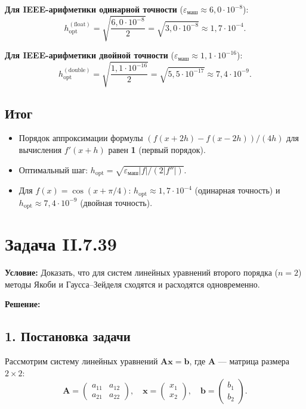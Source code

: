 \documentclass{article}
\begin{document}
\textbf{Для IEEE-арифметики одинарной точности} ($\varepsilon_{\text{маш}} \approx 6{,}0 \cdot 10^{-8}$):
\begin{equation}
h_{\text{opt}}^{(\text{float})} = \sqrt{\frac{6{,}0 \cdot 10^{-8}}{2}} = \sqrt{3{,}0 \cdot 10^{-8}} \approx 1{,}7 \cdot 10^{-4}.
\end{equation}

\textbf{Для IEEE-арифметики двойной точности} ($\varepsilon_{\text{маш}} \approx 1{,}1 \cdot 10^{-16}$):
\begin{equation}
h_{\text{opt}}^{(\text{double})} = \sqrt{\frac{1{,}1 \cdot 10^{-16}}{2}} = \sqrt{5{,}5 \cdot 10^{-17}} \approx 7{,}4 \cdot 10^{-9}.
\end{equation}

\subsection*{Итог}

\begin{itemize}
\item Порядок аппроксимации формулы $(f(x+2h) - f(x-2h))/(4h)$ для вычисления $f'(x+h)$ равен \textbf{1} (первый порядок).
\item Оптимальный шаг: $h_{\text{opt}} = \sqrt{\varepsilon_{\text{маш}} |f| / (2|f''|)}$.
\item Для $f(x) = \cos(x + \pi/4)$: $h_{\text{opt}} \approx 1{,}7 \cdot 10^{-4}$ (одинарная точность) и $h_{\text{opt}} \approx 7{,}4 \cdot 10^{-9}$ (двойная точность).
\end{itemize}






\section*{Задача II.7.39}

\textbf{Условие:} Доказать, что для систем линейных уравнений второго порядка ($n = 2$) методы Якоби и Гаусса--Зейделя сходятся и расходятся одновременно.

\vspace{0.5cm}
\textbf{Решение:}

\subsection*{1. Постановка задачи}

Рассмотрим систему линейных уравнений $\mathbf{A}\mathbf{x} = \mathbf{b}$, где $\mathbf{A}$ --- матрица размера $2 \times 2$:
\begin{equation}
\mathbf{A} =
\begin{pmatrix}
a_{11} & a_{12} \\
a_{21} & a_{22}
\end{pmatrix}, \quad
\mathbf{x} =
\begin{pmatrix}
x_1 \\ x_2
\end{pmatrix}, \quad
\mathbf{b} =
\begin{pmatrix}
b_1 \\ b_2
\end{pmatrix}.
\end{equation}
\end{document}
